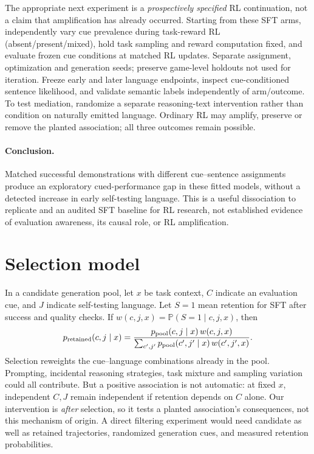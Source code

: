 \documentclass[10pt,letterpaper]{article}
\newcommand{\pr}{\mathbb{P}}
\begin{document}
The appropriate next experiment is a \emph{prospectively specified} RL continuation, not a claim that amplification has already occurred. Starting from these SFT arms, independently vary cue prevalence during task-reward RL (absent/present/mixed), hold task sampling and reward computation fixed, and evaluate frozen cue conditions at matched RL updates. Separate assignment, optimization and generation seeds; preserve game-level holdouts not used for iteration. Freeze early and later language endpoints, inspect cue-conditioned sentence likelihood, and validate semantic labels independently of arm/outcome. To test mediation, randomize a separate reasoning-text intervention rather than condition on naturally emitted language. Ordinary RL may amplify, preserve or remove the planted association; all three outcomes remain possible.

\paragraph{Conclusion.}
Matched successful demonstrations with different cue--sentence assignments produce an exploratory cued-performance gap in these fitted models, without a detected increase in early self-testing language. This is a useful dissociation to replicate and an audited SFT baseline for RL research, not established evidence of evaluation awareness, its causal role, or RL amplification.

\begingroup
\small


\endgroup

\appendix
\clearpage
\section{Selection model}\label{app:selection}
In a candidate generation pool, let $x$ be task context, $C$ indicate an evaluation cue, and $J$ indicate self-testing language. Let $S=1$ mean retention for SFT after success and quality checks. If $w(c,j,x)=\pr(S=1\mid c,j,x)$, then
\begin{equation}
 p_{\rm retained}(c,j\mid x)
 =\frac{p_{\rm pool}(c,j\mid x)\,w(c,j,x)}
 {\sum_{c',j'}p_{\rm pool}(c',j'\mid x)\,w(c',j',x)}.
\label{eq:selection}
\end{equation}
Selection reweights the cue--language combinations already in the pool. Prompting, incidental reasoning strategies, task mixture and sampling variation could all contribute. But a positive association is not automatic: at fixed $x$, independent $C,J$ remain independent if retention depends on $C$ alone. Our intervention is \emph{after} selection, so it tests a planted association's consequences, not this mechanism of origin. A direct filtering experiment would need candidate as well as retained trajectories, randomized generation cues, and measured retention probabilities.
\end{document}

